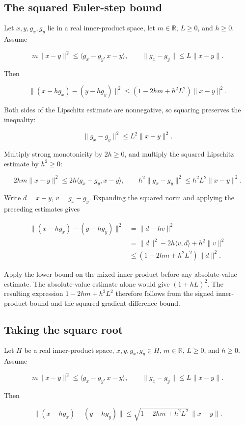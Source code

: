 \documentclass[11pt,a4paper]{article}
\begin{document}
\subsection{\texorpdfstring{The squared Euler-step bound}{The squared Euler-step bound}}


Let \(x,y,g_x,g_y\) lie in a real inner-product space, let \(m\in\mathbb R\), \(L\ge0\), and \(h\ge0\). Assume

\[m\|x-y\|^2\le\langle g_x-g_y,x-y\rangle,\qquad\|g_x-g_y\|\le L\|x-y\|.\]

Then

\[\|(x-hg_x)-(y-hg_y)\|^2\le(1-2hm+h^2L^2)\|x-y\|^2.\]

Both sides of the Lipschitz estimate are nonnegative, so squaring preserves the inequality:

\[\|g_x-g_y\|^2\le L^2\|x-y\|^2.\]

Multiply strong monotonicity by \(2h\ge0\), and multiply the squared Lipschitz estimate by \(h^2\ge0\):

\[2hm\|x-y\|^2\le2h\langle g_x-g_y,x-y\rangle,\qquad h^2\|g_x-g_y\|^2\le h^2L^2\|x-y\|^2.\]

Write \(d=x-y\), \(v=g_x-g_y\). Expanding the squared norm and applying the preceding estimates gives

\[\begin{aligned}\|(x-hg_x)-(y-hg_y)\|^2&=\|d-hv\|^2\\&=\|d\|^2-2h\langle v,d\rangle+h^2\|v\|^2\\&\le(1-2hm+h^2L^2)\|d\|^2.\end{aligned}\]

Apply the lower bound on the mixed inner product before any absolute-value estimate. The absolute-value estimate alone would give \((1+hL)^2\). The resulting expression \(1-2hm+h^2L^2\) therefore follows from the signed inner-product bound and the squared gradient-difference bound.


\subsection{\texorpdfstring{Taking the square root}{Taking the square root}}


Let \(H\) be a real inner-product space, \(x,y,g_x,g_y\in H\), \(m\in\mathbb R\), \(L\ge0\), and \(h\ge0\). Assume

\[m\|x-y\|^2\le\langle g_x-g_y,x-y\rangle,\qquad\|g_x-g_y\|\le L\|x-y\|.\]

Then

\[\|(x-hg_x)-(y-hg_y)\|\le\sqrt{1-2hm+h^2L^2}\,\|x-y\|.\]
\end{document}
